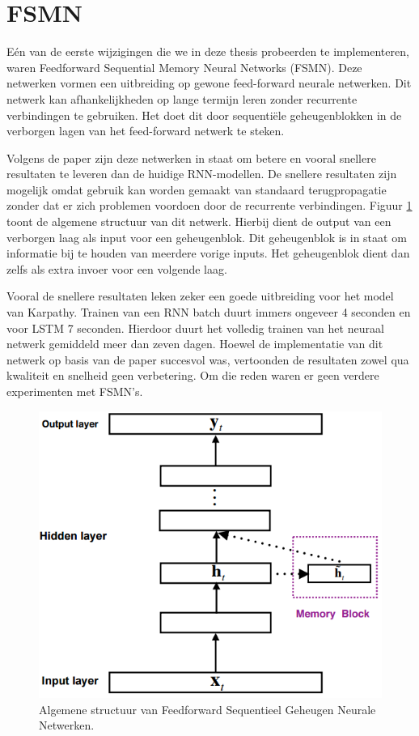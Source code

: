 \section{FSMN}
E\'en van de eerste wijzigingen die we in deze thesis probeerden te implementeren, waren Feedforward Sequential Memory Neural Networks (FSMN)\cite{Zhang}. Deze netwerken vormen een uitbreiding op gewone feed-forward neurale netwerken. Dit netwerk kan afhankelijkheden op lange termijn leren zonder recurrente verbindingen te gebruiken. Het doet dit door sequenti\"ele geheugenblokken in de verborgen lagen van het feed-forward netwerk te steken. 

Volgens de paper zijn deze netwerken in staat om betere en vooral snellere resultaten te leveren dan de huidige RNN-modellen. De snellere resultaten zijn mogelijk omdat gebruik kan worden gemaakt van standaard terugpropagatie zonder dat er zich problemen voordoen door de recurrente verbindingen. Figuur \ref{fig:fsmn} toont de  algemene structuur van dit netwerk. Hierbij dient de output van een verborgen laag als input voor een geheugenblok. Dit geheugenblok is in staat om informatie bij te houden van meerdere vorige inputs. Het geheugenblok dient dan zelfs als extra invoer voor een volgende laag.

Vooral de snellere resultaten leken zeker een goede uitbreiding voor het model van Karpathy. Trainen van een RNN batch duurt immers ongeveer 4 seconden en voor LSTM 7 seconden. Hierdoor duurt het volledig trainen van het neuraal netwerk gemiddeld meer dan zeven dagen.
Hoewel de implementatie van dit netwerk op basis van de paper succesvol was, vertoonden de resultaten zowel qua kwaliteit en snelheid geen verbetering. Om die reden waren er geen verdere experimenten met FSMN's.

\begin{figure}[tb]
	\centering
	\includegraphics[width=0.6\linewidth]{Images/FSMN}
	\caption{Algemene structuur van Feedforward Sequentieel Geheugen Neurale Netwerken.}
	\label{fig:fsmn}
\end{figure}
